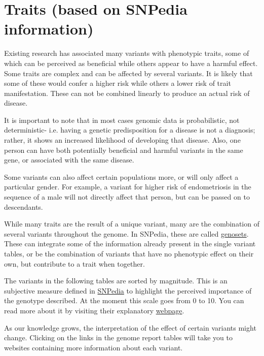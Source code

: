 \documentclass{article}
\begin{document}
\pagebreak



\section{Traits (based on SNPedia information)}

Existing research has associated many variants with phenotypic traits, some of which can be perceived as beneficial while others appear to have a harmful effect. Some traits are complex and can be affected by several variants. It is likely that some of these would confer a higher risk while others a lower risk of trait manifestation. These can not be combined linearly to produce an actual risk of disease. 
\par
It is important to note that in most cases genomic data is probabilistic, not deterministic- i.e. having a genetic predisposition for a disease is not a diagnosis; rather, it shows an increased likelihood of developing that disease. Also, one person can have both potentially beneficial and harmful variants in the same gene, or associated with the same disease. 
\par
Some variants can also affect certain populations more, or will only affect a particular gender. For example, a variant for higher risk of endometriosis in the sequence of a male will not directly affect that person, but can be passed on to descendants.  
\par
While many traits are the result of a unique variant, many are the combination of several variants throughout the genome. In SNPedia, these are called  \href{https://www.snpedia.com/index.php/Genoset}{genosets}. These can integrate some of the information already present in the single variant tables, or be the combination of variants that have no phenotypic effect on their own, but contribute to a trait when together.
\par
The variants in the following tables are sorted by magnitude. This is an subjective measure defined in \href{https://www.snpedia.com}{SNPedia} to highlight the perceived importance of the genotype described. At the moment this scale goes from 0 to 10. You can read more about it by visiting their explanatory \href{https://www.snpedia.com/index.php/Magnitude}{webpage}.
\par
As our knowledge grows, the interpretation of the effect of certain variants might change. Clicking on the links in the genome report tables will take you to websites containing more information about each variant.
\end{document}

